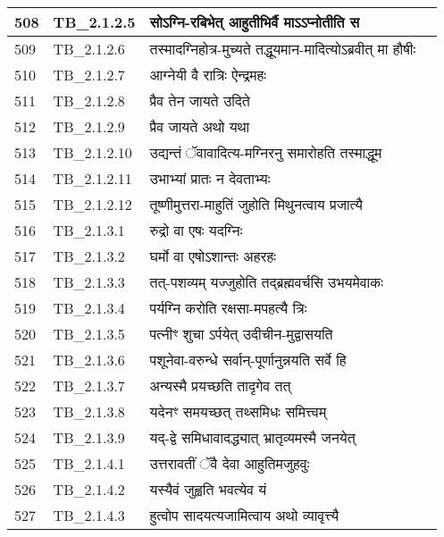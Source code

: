 \documentclass[17pt]{extarticle}
\begin{document}
\begin{longtable}{||p{0.4in}||p{0.9in}||p{4.0in}||p{0.9in}||}
        \hline
            508 & TB\_2.1.2.5 & सोऽग्नि{-}रबिभेत् आहुतीभिर्वै माऽऽप्नोतीति स &      \\
        \hline
            509 & TB\_2.1.2.6 & तस्मादग्निहोत्र{-}मुच्यते तद्धूयमान{-}मादित्योऽब्रवीत् मा हौषीः &      \\
        \hline
            510 & TB\_2.1.2.7 & आग्नेयी वै रात्रिः ऐन्द्रमहः &      \\
        \hline
            511 & TB\_2.1.2.8 & प्रैव तेन जायते उदिते &      \\
        \hline
            512 & TB\_2.1.2.9 & प्रैव जायते अथो यथा &      \\
        \hline
            513 & TB\_2.1.2.10 & उद्यन्तं ॅवावादित्य{-}मग्निरनु समारोहति तस्माद्धूम &      \\
        \hline
            514 & TB\_2.1.2.11 & उभाभ्यां प्रातः न देवताभ्यः &      \\
        \hline
            515 & TB\_2.1.2.12 & तूष्णीमुत्तरा{-}माहुतिं जुहोति मिथुनत्वाय प्रजात्यै &      \\
        \hline
            516 & TB\_2.1.3.1 & रुद्रो वा एषः यदग्निः &      \\
        \hline
            517 & TB\_2.1.3.2 & घर्मो वा एषोऽशान्तः अहरहः &      \\
        \hline
            518 & TB\_2.1.3.3 & तत्{-}पशव्यम् यज्जुहोति तद्ब्रह्मवर्चसि उभयमेवाकः &      \\
        \hline
            519 & TB\_2.1.3.4 & पर्यग्नि करोति रक्षसा{-}मपहत्यै त्रिः &      \\
        \hline
            520 & TB\_2.1.3.5 & पत्नीꣳ शुचा ऽर्पयेत् उदीचीन{-}मुद्वासयति &      \\
        \hline
            521 & TB\_2.1.3.6 & पशूनेवा{-}वरुन्धे सर्वान्{-}पूर्णानुन्नयति सर्वे हि &      \\
        \hline
            522 & TB\_2.1.3.7 & अन्यस्मै प्रयच्छति तादृगेव तत् &      \\
        \hline
            523 & TB\_2.1.3.8 & यदेनꣳ समयच्छत् तथ्समिधः समित्त्वम् &      \\
        \hline
            524 & TB\_2.1.3.9 & यद्{-}द्वे समिधावादद्ध्यात् भ्रातृव्यमस्मै जनयेत् &      \\
        \hline
            525 & TB\_2.1.4.1 & उत्तरावतीं ॅवै देवा आहुतिमजुहवुः &      \\
        \hline
            526 & TB\_2.1.4.2 & यस्यैवं जुह्वति भवत्येव यं &      \\
        \hline
            527 & TB\_2.1.4.3 & हुत्वोप सादयत्यजामित्वाय अथो व्यावृत्त्यै &      \\

\end{longtable}
\end{document}
